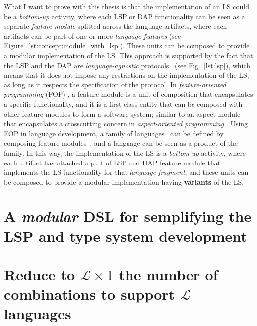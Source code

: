 What I want to prove with this thesis is that the implementation of an LS could be a \textit{bottom-up} activity, where each LSP or DAP functionality can be seen as a separate \textit{feature module} \cite{Batory04, Kastner11} splitted across the language artifacts, where each artifacts can be part of one or more \textit{language features} (see Figure~\ref{lst:concept:module_with_lsp}). These units can be composed to provide a modular implementation of the LS. This approach is supported by the fact that the LSP and the DAP are \textit{language-agnostic} protocols~\cite{Niephaus20, Rodriguez-Echeverria18} (see Fig.~\ref{lst:lsp}), which means that it does not impose any restrictions on the implementation of the LS, as long as it respects the specification of the protocol.
In \textit{feature-oriented programming} (FOP) \cite{Apel13, Czarnecki04, Prehofer01}, a feature module is a unit of composition that encapsulates a specific functionality, and it is a first-class entity that can be composed with other feature modules to form a software system; similar to an aspect module that encapsulates a crosscutting concern in \textit{aspect-oriented programming} \cite{Kiczales01, Kiczales97, Laddad03}. Using FOP in language development, a family of languages~\cite{Liebig13} can be defined by composing feature modules~\cite{Wende09}, and a language can be seen as a product of the family.
In this way, the implementation of the LS is a \textit{bottom-up} activity, where each artifact has attached a part of LSP and DAP feature module that implements the LS functionality for that \textit{language fragment}, and these units can be composed to provide a modular implementation having \textbf{variants} of the LS.


\section{A \textit{modular} DSL for semplifying the LSP and type system development}\label{sec:concept:AModularDSLForSemplifyingTheLSPAndTypeSystemDevelopment}

\section{Reduce to $\mathcal{L} \times 1$ the number of combinations to support $\mathcal{L}$ languages}


